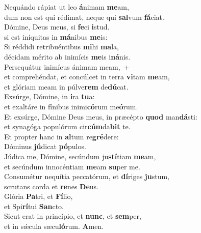 \evenverse Nequándo rápiat ut leo \textbf{á}nimam \textbf{me}am,~\*\\
\evenverse dum non est qui rédimat, neque qui \textbf{sal}vum \textbf{fá}ciat.\\
\oddverse Dómine, Deus meus, si \textbf{fe}ci \textbf{i}stud.~\*\\
\oddverse si est iníquitas in \textbf{má}nibus \textbf{me}is:\\
\evenverse Si réddidi retribuéntibus \textbf{mi}hi \textbf{ma}la,~\*\\
\evenverse décidam mérito ab inimícis \textbf{me}is i\textbf{ná}nis.\\
\oddverse Persequátur inimícus ánimam meam,~+\\
\oddverse  et comprehéndat, et concúlcet in terra \textbf{vi}tam \textbf{me}am,~\*\\
\oddverse et glóriam meam in púlve\textbf{rem} de\textbf{dú}cat.\\
\evenverse Exsúrge, Dómine, in \textbf{i}ra \textbf{tu}a:~\*\\
\evenverse et exaltáre in fínibus inimi\textbf{có}rum me\textbf{ó}rum.\\
\oddverse Et exsúrge, Dómine Deus meus, in præcépto \textbf{quod} man\textbf{dá}sti:~\*\\
\oddverse et synagóga populórum cir\textbf{cúm}da\textbf{bit} te.\\
\evenverse Et propter hanc in \textbf{al}tum re\textbf{gré}dere:~\*\\
\evenverse Dóminus \textbf{jú}dicat \textbf{pó}pulos.\\
\oddverse Júdica me, Dómine, secúndum ju\textbf{stí}tiam \textbf{me}am,~\*\\
\oddverse et secúndum innocéntiam \textbf{me}am \textbf{su}per me.\\
\evenverse Consumétur nequítia peccatórum, et \textbf{dí}riges \textbf{ju}stum,~\*\\
\evenverse scrutans corda et \textbf{re}nes \textbf{De}us.\\
\oddverse Glória \textbf{Pa}tri, et \textbf{Fí}lio,~\*\\
\oddverse et Spi\textbf{rí}tui \textbf{San}cto.\\
\evenverse Sicut erat in princípio, et \textbf{nunc}, et \textbf{sem}per,~\*\\
\evenverse et in sǽcula sæcu\textbf{ló}rum. \textbf{A}men.\\
